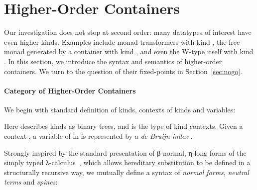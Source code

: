 \section{Higher-Order Containers}
\label{sec:higher}

Our investigation does not stop at second order: many datatypes of interest have even higher kinds. Examples include monad transformers with kind \AgdaSymbol{(}\;\;\AgdaSymbol{)}\;\;\;\;, the free monad generated by a container with kind \;\;\;\;, and even the W-type itself with kind \;\;. In this section, we introduce the syntax and semantics of higher-order containers. We turn to the question of their fixed-points in Section~\ref{sec:nogo}.

\paragraph*{Category of Higher-Order Containers}

We begin with standard definition of kinds, contexts of kinds and variables:



Here  describes kinds as binary trees, and  is the type of kind contexts. Given a context \;\AgdaSymbol{:}\;, a variable of \;\AgdaSymbol{:}\; in  is represented by a \emph{de Bruijn index} \;\;.

Strongly inspired by the standard presentation of β-normal, η-long forms of the simply typed λ-calculus~\cite{KellerA10}, which allows hereditary substitution to be defined in a structurally recursive way, we mutually define a syntax of \emph{normal forms}, \emph{neutral terms} and \emph{spines}:



